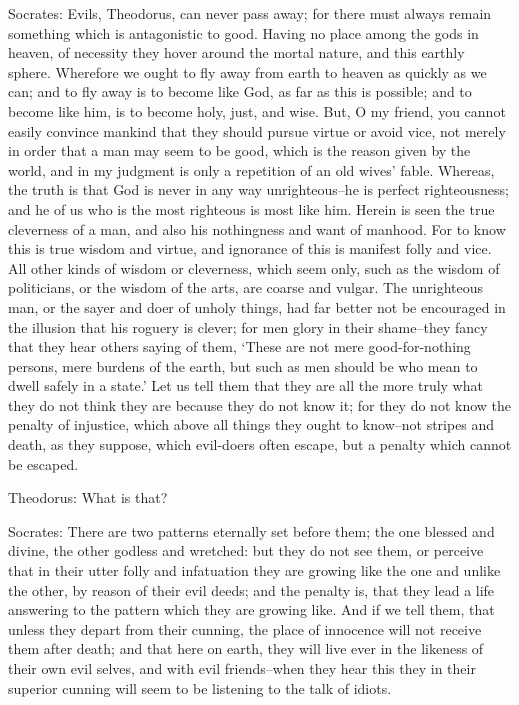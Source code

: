 Socrates: Evils, Theodorus, can never pass away; for there must always
remain something which is antagonistic to good. Having no place among
the gods in heaven, of necessity they hover around the mortal nature,
and this earthly sphere. Wherefore we ought to fly away from earth to
heaven as quickly as we can; and to fly away is to become like God,
as far as this is possible; and to become like him, is to become holy,
just, and wise. But, O my friend, you cannot easily convince mankind
that they should pursue virtue or avoid vice, not merely in order that a
man may seem to be good, which is the reason given by the world, and in
my judgment is only a repetition of an old wives' fable. Whereas,
the truth is that God is never in any way unrighteous--he is perfect
righteousness; and he of us who is the most righteous is most like him.
Herein is seen the true cleverness of a man, and also his nothingness
and want of manhood. For to know this is true wisdom and virtue, and
ignorance of this is manifest folly and vice. All other kinds of wisdom
or cleverness, which seem only, such as the wisdom of politicians, or
the wisdom of the arts, are coarse and vulgar. The unrighteous man, or
the sayer and doer of unholy things, had far better not be encouraged
in the illusion that his roguery is clever; for men glory in their
shame--they fancy that they hear others saying of them, `These are not
mere good-for-nothing persons, mere burdens of the earth, but such as
men should be who mean to dwell safely in a state.' Let us tell them
that they are all the more truly what they do not think they are because
they do not know it; for they do not know the penalty of injustice,
which above all things they ought to know--not stripes and death, as
they suppose, which evil-doers often escape, but a penalty which cannot
be escaped.

Theodorus: What is that?

Socrates: There are two patterns eternally set before them; the one
blessed and divine, the other godless and wretched: but they do not see
them, or perceive that in their utter folly and infatuation they are
growing like the one and unlike the other, by reason of their evil
deeds; and the penalty is, that they lead a life answering to the
pattern which they are growing like. And if we tell them, that unless
they depart from their cunning, the place of innocence will not receive
them after death; and that here on earth, they will live ever in the
likeness of their own evil selves, and with evil friends--when they hear
this they in their superior cunning will seem to be listening to the
talk of idiots.

